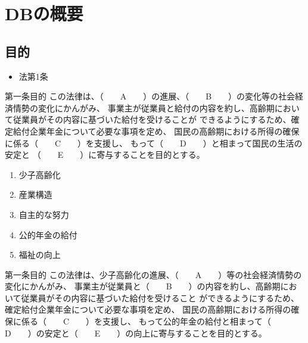 \section{DBの概要}

\subsection{目的}

\begin{InyouJobunbox}
  \begin{itemize}
    \item 法第1条
  \end{itemize}
\end{InyouJobunbox}




\begin{fillblank}[年金2 \ 2021 \ 問題1(2)]

  \begin{lawstructure}
    \begin{lawarticle}{第一条}{目的}
      この法律は、（　　A　　）の進展、（　　B　　）の変化等の社会経済情勢の変化にかんがみ、
      事業主が従業員と給付の内容を約し、高齢期において従業員がその内容に基づいた給付を受けることが
      できるようにするため、確定給付企業年金について必要な事項を定め、
      国民の高齢期における所得の確保に係る（　　C　　）を支援し、
      もって（　　D　　）と相まって国民の生活の安定と
      （　　E　　）に寄与することを目的とする。
    \end{lawarticle}
  \end{lawstructure}

\end{fillblank}


\begin{answerbox}
 \begin{enumerate}[A:]
    \item 少子高齢化
    \item 産業構造
    \item 自主的な努力
    \item 公的年金の給付
    \item 福祉の向上
  \end{enumerate}
\end{answerbox}

\begin{fillblank}[数理人試験 \ 2023 \ 問題1 \ 設問1（抜粋）]

  \begin{lawstructure}
    \begin{lawarticle}{第一条}{目的}
      この法律は、少子高齢化の進展、（　　A　　）等の社会経済情勢の変化にかんがみ、
      事業主が従業員と（　　B　　）の内容を約し、高齢期において従業員がその内容に基づいた給付を受けること
      ができるようにするため、確定給付企業年金について必要な事項を定め、
      国民の高齢期における所得の確保に係る（　　C　　）を支援し、
      もって公的年金の給付と相まって（　　D　　）の安定と（　　E　　）の向上に寄与することを目的とする。
    \end{lawarticle}
  \end{lawstructure}

\end{fillblank}

